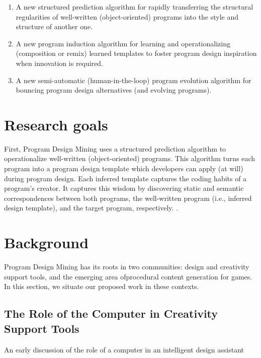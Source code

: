 \begin{enumerate}
	\item A new structured prediction algorithm for rapidly transferring 
	the structural regularities of well-written (object-oriented) programs 
	into the style and structure of another one.
	\item A new program induction algorithm for learning and operationalizing 
	(composition or remix) learned templates to foster program design 
	inspiration when innovation is required.
	\item A new semi-automatic (human-in-the-loop) program evolution algorithm 
	for bouncing program design alternatives (and evolving programs). 
\end{enumerate}

\section*{Research goals} %
\label{sec:goals}

First, Program Design Mining uses a structured prediction algorithm to operationalize 
well-written (object-oriented) programs. This algorithm turns each program into a 
program design template which developers can apply (at will) during program design. 
Each inferred template captures the coding habits of a program's creator. It captures 
this wisdom by discovering static and semantic correspondences between both programs, 
the well-written program (i.e., inferred design template), and the target program, 
respectively. .

\section*{Background} %
\label{sec:background}

Program Design Mining has its roots in two communities: design and creativity 
support tools, and the emerging area ofprocedural content generation for games. 
In this section, we situate our proposed work in these contexts.

\subsection*{The Role of the Computer in Creativity Support Tools} %
\label{subsec:creativity}

An early discussion of the role of a computer in an intelligent design assistant

